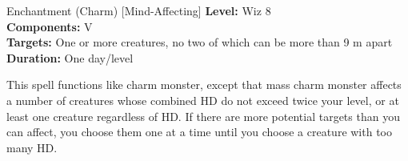 {Enchantment (Charm) [Mind-Affecting]}
{
	\textbf{Level:}
	Wiz 8\\
	\textbf{Components:}
	V\\
	\textbf{Targets:}
	One or more creatures, no two of which can be more than 9 m apart\\
	\textbf{Duration:}
	One day/level\\
}
{
	This spell functions like charm monster, except that mass charm monster affects a number of creatures whose combined HD do not exceed twice your level, or at least one creature regardless of HD. If there are more potential targets than you can affect, you choose them one at a time until you choose a creature with too many HD.

}
